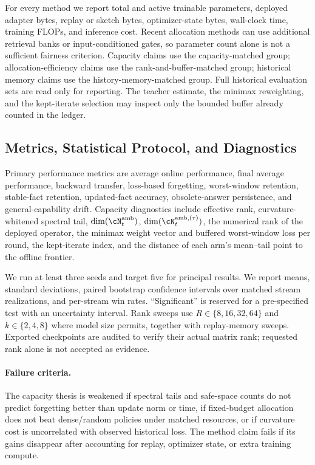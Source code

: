 For every method we report total and active trainable parameters, deployed
adapter bytes, replay or sketch bytes, optimizer-state bytes, wall-clock time,
training FLOPs, and inference cost. Recent allocation methods can use additional
retrieval banks or input-conditioned gates, so parameter count alone is not a
sufficient fairness criterion. Capacity claims use the capacity-matched group;
allocation-efficiency claims use the rank-and-buffer-matched group; historical
memory claims use the history-memory-matched group. Full historical evaluation
sets are read only for reporting. The teacher estimate, the minimax reweighting,
and the kept-iterate selection may inspect only the bounded buffer already
counted in the ledger.

\subsection{Metrics, Statistical Protocol, and Diagnostics}

Primary performance metrics are average online performance, final average
performance, backward transfer, loss-based forgetting, worst-window retention,
stable-fact retention, updated-fact accuracy, obsolete-answer persistence, and
general-capability drift. Capacity diagnostics include effective rank,
curvature-whitened spectral tail,
$\operatorname{dim}(\cN_t^{\mathrm{amb}})$,
$\operatorname{dim}(\cN_t^{\mathrm{amb},(\tau)})$, the numerical rank of the
deployed operator, the minimax weight vector and buffered worst-window loss per
round, the kept-iterate index, and the distance of each arm's mean--tail point to
the offline frontier.

We run at least three seeds and target five for principal results. We report
means, standard deviations, paired bootstrap confidence intervals over matched
stream realizations, and per-stream win rates. ``Significant'' is reserved for
a pre-specified test with an uncertainty interval. Rank sweeps use
$R\in\{8,16,32,64\}$ and $k\in\{2,4,8\}$ where model size permits, together
with replay-memory sweeps. Exported checkpoints are audited to verify their
actual matrix rank; requested rank alone is not accepted as evidence.

\paragraph{Failure criteria.}
The capacity thesis is weakened if spectral tails and safe-space counts do not
predict forgetting better than update norm or time, if fixed-budget allocation
does not beat dense/random policies under matched resources, or if curvature
cost is uncorrelated with observed historical loss. The method claim fails if
its gains disappear after accounting for replay, optimizer state, or extra
training compute.

